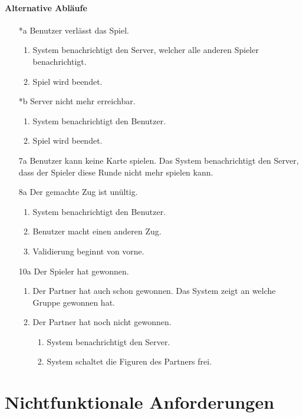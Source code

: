 \documentclass[a4paper,12pt,halfparskip,DIV14]{scrartcl}
\begin{document}
\paragraph{Alternative Abläufe}
\begin{enumerate}
	\item[*a] Benutzer verlässt das Spiel.
	\begin{enumerate}
		\item System benachrichtigt den Server, welcher alle anderen Spieler benachrichtigt.
		\item Spiel wird beendet.
	\end{enumerate}
	\item[*b] Server nicht mehr erreichbar.
	\begin{enumerate}
		\item System benachrichtigt den Benutzer.
		\item Spiel wird beendet.
	\end{enumerate}	\item[7a] Benutzer kann keine Karte spielen.\newline
	Das System benachrichtigt den Server, dass der Spieler diese Runde nicht mehr spielen kann.
	\item[8a] Der gemachte Zug ist unültig.
	\begin{enumerate}
		\item System benachrichtigt den Benutzer.
		\item Benutzer macht einen anderen Zug.
		\item Validierung beginnt von vorne.
	\end{enumerate}
	\item[10a] Der Spieler hat gewonnen.
	\begin{enumerate}
		\item Der Partner hat auch schon gewonnen.\newline
		Das System zeigt an welche Gruppe gewonnen hat.
		\item Der Partner hat noch nicht gewonnen.
		\begin{enumerate}
			\item System benachrichtigt den Server.
			\item System schaltet die Figuren des Partners frei.
		\end{enumerate}
	\end{enumerate}
\end{enumerate}

\section{Nichtfunktionale Anforderungen}\label{cha:nichtfunktionale_anforderungen} %
\end{document}
